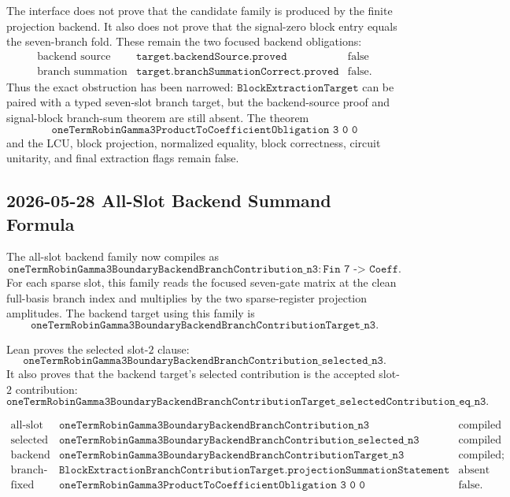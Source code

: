 The interface does not prove that the candidate family is produced by the
finite projection backend.  It also does not prove that the signal-zero block
entry equals the seven-branch fold.  These remain the two focused backend
obligations:
\[
\begin{array}{lll}
\text{backend source} &
\texttt{target.backendSource.proved} &
\text{false}\\
\text{branch summation} &
\texttt{target.branchSummationCorrect.proved} &
\text{false}.
\end{array}
\]
Thus the exact obstruction has been narrowed: \(\texttt{BlockExtractionTarget}\)
can be paired with a typed seven-slot branch target, but the backend-source
proof and signal-block branch-sum theorem are still absent.  The theorem
\[
  \texttt{oneTermRobinGamma3ProductToCoefficientObligation\ 3\ 0\ 0}
\]
and the LCU, block projection, normalized equality, block correctness, circuit
unitarity, and final extraction flags remain false.

\subsection{2026-05-28 All-Slot Backend Summand Formula}

The all-slot backend family now compiles as
\[
  \texttt{oneTermRobinGamma3BoundaryBackendBranchContribution\_n3}
  \colon \texttt{Fin 7 -> Coeff}.
\]
For each sparse slot, this family reads the focused seven-gate matrix at the
clean full-basis branch index and multiplies by the two sparse-register
projection amplitudes.  The backend target using this family is
\[
  \texttt{oneTermRobinGamma3BoundaryBackendBranchContributionTarget\_n3}.
\]

Lean proves the selected slot-\(2\) clause:
\[
  \texttt{oneTermRobinGamma3BoundaryBackendBranchContribution\_selected\_n3}.
\]
It also proves that the backend target's selected contribution is the accepted
slot-\(2\) contribution:
\[
  \texttt{oneTermRobinGamma3BoundaryBackendBranchContributionTarget\_selectedContribution\_eq\_n3}.
\]

\[
\begin{array}{lll}
\text{all-slot family} &
\texttt{oneTermRobinGamma3BoundaryBackendBranchContribution\_n3} &
\text{compiled}\\
\text{selected slot theorem} &
\texttt{oneTermRobinGamma3BoundaryBackendBranchContribution\_selected\_n3} &
\text{compiled}\\
\text{backend target} &
\texttt{oneTermRobinGamma3BoundaryBackendBranchContributionTarget\_n3} &
\text{compiled; semantic flags false}\\
\text{branch-sum theorem} &
\texttt{BlockExtractionBranchContributionTarget.projectionSummationStatement} &
\text{absent}\\
\text{fixed product theorem} &
\texttt{oneTermRobinGamma3ProductToCoefficientObligation\ 3\ 0\ 0} &
\text{false}.
\end{array}
\]

